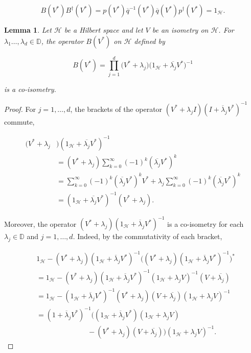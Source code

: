 \documentclass[10pt, reqno]{amsart}
\newtheorem{lemma}[theorem]{Lemma}
\theoremstyle{definition}
\numberwithin{equation}{section}
\begin{document}
$$ B(V^{*})B^{\dagger}(V^{*}) = p(V^{*})\overline{q}^{-1}(V^{*})\overline{q}(V^{*})p^{\dagger}(V^{*}) = 1_{\mathcal{H}}.$$

\begin{lemma}\label{blaschkeoperatorcoisom}
Let $\mathcal{H}$ be a Hilbert space and let $V$ be an isometry on $\mathcal{H}$. For $\lambda_{1}\hdots,\lambda_{d}\in\mathbb{D}$, the operator $B(V^{*})$ on $\mathcal{H}$ defined by

$$B(V^{*}) =\prod_{j=1}^{d}\big(V^{*}+\lambda_{j}\big)\big(1_{\mathcal{H}}+\overline{\lambda_{j}}V^{*}\big)^{-1}$$

\noindent is a co-isometry.

\end{lemma}

\begin{proof}
For $j=1,\hdots,d$, the brackets of the operator $(V^{*}+\lambda_{j}I)(I+\overline{\lambda}_{j}V^{*})^{-1}$ commute, 

\begin{align*}(V^{*}+\lambda_{j}&)(1_{\mathcal{H}}+\overline{\lambda_{j}}V^{*})^{-1} \\
&= (V^{*}+\lambda_{j})\sum_{k=0}^{\infty}(-1)^{k}(\overline{\lambda_{j}}V^{*})^{k} \\
&=\sum_{k=0}^{\infty}(-1)^{k}(\overline{\lambda_{j}}V^{*})^{k}V^{*}+\lambda_{j}\sum_{k=0}^{\infty}(-1)^{k}(\overline{\lambda_{j}}V^{*})^{k}\\
&=(1_{\mathcal{H}}+\overline{\lambda_{j}}V^{*})^{-1}(V^{*}+\lambda_{j}).
\end{align*}

\noindent Moreover, the operator $(V^{*}+\lambda_{j})(1_{\mathcal{H}}+\overline{\lambda}_{j}V^{*})^{-1}$ is a co-isometry for each $\lambda_{j}\in\mathbb{D}$ and $j=1,\hdots,d$. Indeed, by the commutativity of each bracket,

\begin{align*}
    &1_{\mathcal{H}}-(V^{*}+\lambda_{j})(1_{\mathcal{H}}+\overline{\lambda}_{j}V^{*})^{-1}\bigg((V^{*}+\lambda_{j})(1_{\mathcal{H}}+\overline{\lambda}_{j}V^{*})^{-1}\bigg)^{*}\\
    &=1_{\mathcal{H}} - (V^{*}+\lambda_{j})(1_{\mathcal{H}}+\overline{\lambda}_{j}V^{*})^{-1}(1_{\mathcal{H}}+\lambda_{j}V)^{-1}(V+\overline{\lambda_{j}}) \\
    &= 1_{\mathcal{H}} - (1_{\mathcal{H}}+\overline{\lambda}_{j}V^{*})^{-1}(V^{*}+\lambda_{j})(V+\overline{\lambda_{j}})(1_{\mathcal{H}}+\lambda_{j}V)^{-1}\\
    &= (1+\overline{\lambda}_{j}V^{*})^{-1}\bigg((1_{\mathcal{H}}+\overline{\lambda}_{j}V^{*})(1_{\mathcal{H}}+\lambda_{j}V) \\
    &\hspace{3cm}- (V^{*}+\lambda_{j})(V+\overline{\lambda_{j}})\bigg)(1_{\mathcal{H}}+\lambda_{j}V)^{-1}.
\end{align*}


\end{proof}
\end{document}
